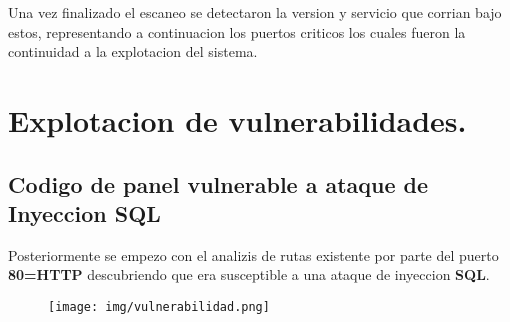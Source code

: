 \documentclass[a4paper]{article} %
\begin{document}
	\vspace{1cm}
	Una vez finalizado el escaneo se detectaron la version y servicio que corrian bajo estos, representando a continuacion los puertos criticos los cuales fueron la continuidad a la explotacion del sistema.
	
	
	\clearpage
	\section{Explotacion de vulnerabilidades.}
	\subsection{Codigo de panel vulnerable a ataque de Inyeccion SQL}
	Posteriormente se empezo con el analizis de rutas existente por parte del puerto \textbf{80=HTTP} descubriendo que era susceptible a una ataque de inyeccion \textbf{SQL}.
	\vspace{0.5cm}
	\begin{figure}[h]
	\center	
		\texttt{[image: img/vulnerabilidad.png]}
	\end{figure}
		
\end{document}
